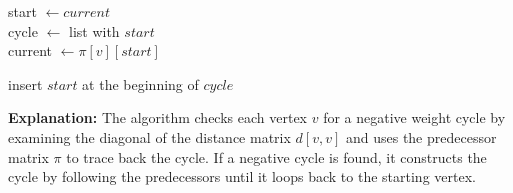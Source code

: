 \begin{parts}
\begin{customsolutionbox}
\begin{algorithm}[H]
{{{                            %
                            start $\gets current$ \\
                            cycle $\gets$ list with $start$ \\
                            current $\gets \pi[v][start]$


                            insert $start$ at the beginning of $cycle$ \\
                        }
                    }

                }
                \end{algorithm}
                \textbf{Explanation:} The algorithm checks each vertex $v$ for a negative weight cycle by examining the diagonal of the distance matrix $d[v, v]$
                and uses the predecessor matrix $\pi$ to trace back the cycle. If a negative cycle is found, it constructs the cycle by following the predecessors until it loops back to the starting vertex.
            \end{customsolutionbox}

\end{parts}